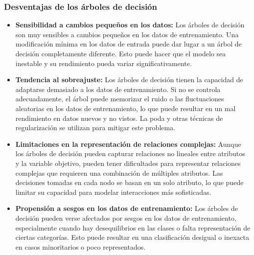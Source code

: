 \subsubsection{Desventajas de los árboles de decisión}
\begin{itemize}
    \item \textbf{Sensibilidad a cambios pequeños en los datos:} Los árboles de decisión son muy sensibles a cambios pequeños en los datos de entrenamiento. Una modificación mínima en los datos de entrada puede dar lugar a un árbol de decisión completamente diferente. Esto puede hacer que el modelo sea inestable y su rendimiento pueda variar significativamente.
    \item \textbf{Tendencia al sobreajuste:} Los árboles de decisión tienen la capacidad de adaptarse demasiado a los datos de entrenamiento. Si no se controla adecuadamente, el árbol puede memorizar el ruido o las fluctuaciones aleatorias en los datos de entrenamiento, lo que puede resultar en un mal rendimiento en datos nuevos y no vistos. La poda y otras técnicas de regularización se utilizan para mitigar este problema.
    \item \textbf{Limitaciones en la representación de relaciones complejas:} Aunque los árboles de decisión pueden capturar relaciones no lineales entre atributos y la variable objetivo, pueden tener dificultades para representar relaciones complejas que requieren una combinación de múltiples atributos. Las decisiones tomadas en cada nodo se basan en un solo atributo, lo que puede limitar su capacidad para modelar interacciones más sofisticadas.
    \item \textbf{Propensión a sesgos en los datos de entrenamiento:} Los árboles de decisión pueden verse afectados por sesgos en los datos de entrenamiento, especialmente cuando hay desequilibrios en las clases o falta representación de ciertas categorías. Esto puede resultar en una clasificación desigual o inexacta en casos minoritarios o poco representados.
\end{itemize}